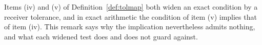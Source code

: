 
Items (iv) and (v) of Definition~\ref{def:tolmap} both widen an exact
condition by a receiver tolerance, and in exact arithmetic the condition of
item (v) implies that of item (iv). This remark says why the implication
nevertheless admits nothing, and what each widened test does and does not
guard against.

